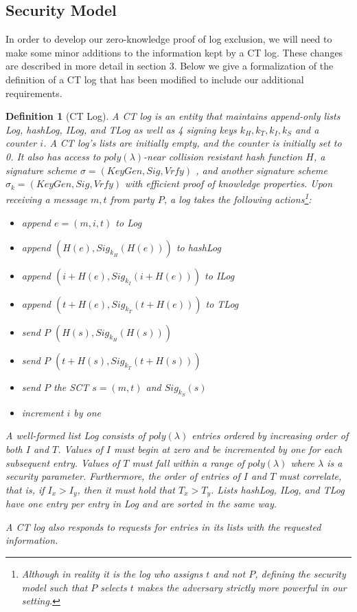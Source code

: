 \documentclass[letterpaper,twocolumn,10pt]{article}
\newtheorem{definition}[theorem]{Definition}
\begin{document}
\subsection{Security Model}
In order to develop our zero-knowledge proof of log exclusion, we will need to make some minor additions to the information kept by a CT log. These changes are described in more detail in section 3. Below we give a formalization of the definition of a CT log that has been modified to include our additional requirements. 
\begin{definition}[CT Log]
A CT log is an entity that maintains append-only lists Log, hashLog, ILog, and TLog as well as 4 signing keys $k_H, k_T, k_I, k_S$ and a counter $i$. A CT log's lists are initially empty, and the counter is initially set to 0. It also has access to $poly(\lambda)$-near collision resistant hash function $H$, a signature scheme $\sigma=(KeyGen, Sig, Vrfy)$ , and another signature scheme $\sigma_k = (KeyGen, Sig, Vrfy)$ with efficient proof of knowledge properties. Upon receiving a message $m, t$ from party $P$, a log takes the following actions\footnote{Although in reality it is the log who assigns $t$ and not $P$, defining the security model such that $P$ selects $t$ makes the adversary strictly more powerful in our setting.}:
\begin{itemize}
\item append $e = (m, i, t)$ to Log
\item append $(H(e), Sig_{k_H}(H(e)))$ to hashLog
\item append $(i+H(e), Sig_{k_I}(i+H(e)))$ to ILog
\item append $(t+H(e), Sig_{k_T}(t+H(e)))$ to TLog
\item send $P$ $(H(s), Sig_{k_H}(H(s)))$
\item send $P$ $(t+H(s), Sig_{k_T}(t+H(s)))$
\item send $P$ the SCT $s=(m, t)$ and $Sig_{k_S}(s)$
\item increment $i$ by one
\end{itemize}

A well-formed list Log consists of $poly(\lambda)$ entries ordered by increasing order of both $I$ and $T$. Values of $I$ must begin at zero and be incremented by one for each subsequent entry. Values of $T$ must fall within a range of $poly(\lambda)$ where $\lambda$ is a security parameter. Furthermore, the order of entries of $I$ and $T$ must correlate, that is, if $I_x>I_y$, then it must hold that $T_x>T_y$. Lists hashLog, ILog, and TLog have one entry per entry in Log and are sorted in the same way.

A CT log also responds to requests for entries in its lists with the requested information.
\end{definition}
\end{document}
